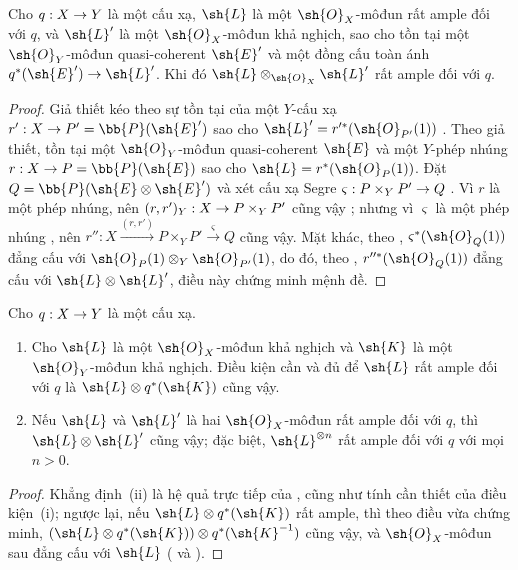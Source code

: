 \documentclass[oneside,10pt]{amsart}
\makeatletter
\newcommand{\ega@arrow}[2]{\mathchoice{#1}{#2}{#2}{#2}}
\renewcommand{\to}{\ega@arrow{\longrightarrow}{\rightarrow}}
\newcommand{\oldpage}[2][]{\marginnote{\normalfont\footnotesize\textbf{#1}~|~#2}\ignorespaces}
\let\EGAOriginalLabel\label
\renewcommand{\label}[1]{\phantomsection\EGAOriginalLabel{#1}}
\makeatother
\begin{document}
\begin{proposition}[4.4.8]
\label{II.4.4.8}
Cho $q:X\to Y$ là một cấu xạ, $\sh{L}$ là một $\sh{O}_X$-môđun rất ample đối với $q$, và $\sh{L}'$ là một $\sh{O}_X$-môđun khả nghịch, sao cho tồn tại một $\sh{O}_Y$-môđun quasi-coherent $\sh{E}'$ và một đồng cấu toàn ánh $q^*(\sh{E}')\to\sh{L}'$.
Khi đó $\sh{L}\otimes_{\sh{O}_X}\sh{L}'$ rất ample đối với $q$.
\end{proposition}

\begin{proof}
Giả thiết kéo theo sự tồn tại của một $Y$-cấu xạ $r':X\to P'=\bb{P}(\sh{E}')$ sao cho $\sh{L}'=r'^*(\sh{O}_{P'}(1))$ .
Theo giả thiết, tồn tại một $\sh{O}_Y$-môđun quasi-coherent $\sh{E}$ và một
\oldpage[II]{81}
$Y$-phép nhúng $r:X\to P=\bb{P}(\sh{E})$ sao cho $\sh{L}=r^*(\sh{O}_P(1))$.
Đặt $Q=\bb{P}(\sh{E}\otimes\sh{E}')$ và xét cấu xạ Segre $\varsigma:P\times_Y P'\to Q$ .
Vì $r$ là một phép nhúng, nên $(r,r')_Y:X\to P\times_Y P'$ cũng vậy ;
nhưng vì $\varsigma$ là một phép nhúng , nên $r'':X\xrightarrow{(r,r')}P\times_Y P'\xrightarrow{\varsigma}Q$ cũng vậy.
Mặt khác, theo , $\varsigma^*(\sh{O}_Q(1))$ đẳng cấu với $\sh{O}_P(1)\otimes_Y\sh{O}_{P'}(1)$, do đó, theo , $r''^*(\sh{O}_Q(1))$ đẳng cấu với $\sh{L}\otimes\sh{L}'$, điều này chứng minh mệnh đề.
\end{proof}

\begin{corollary}[4.4.9]
\label{II.4.4.9}
Cho $q:X\to Y$ là một cấu xạ.
\begin{enumerate}
  \item Cho $\sh{L}$ là một $\sh{O}_X$-môđun khả nghịch và $\sh{K}$ là một $\sh{O}_Y$-môđun khả nghịch.
  Điều kiện cần và đủ để $\sh{L}$ rất ample đối với $q$ là $\sh{L}\otimes q^*(\sh{K})$ cũng vậy.
  \item Nếu $\sh{L}$ và $\sh{L}'$ là hai $\sh{O}_X$-môđun rất ample đối với $q$, thì $\sh{L}\otimes\sh{L}'$ cũng vậy;
  đặc biệt, $\sh{L}^{\otimes n}$ rất ample đối với $q$ với mọi $n>0$.
\end{enumerate}
\end{corollary}

\begin{proof}
Khẳng định~(ii) là hệ quả trực tiếp của , cũng như tính cần thiết của điều kiện~(i);
ngược lại, nếu $\sh{L}\otimes q^*(\sh{K})$ rất ample, thì theo điều vừa chứng minh, $(\sh{L}\otimes q^*(\sh{K}))\otimes q^*(\sh{K}^{-1})$ cũng vậy, và $\sh{O}_X$-môđun sau đẳng cấu với $\sh{L}$ ( và ).
\end{proof}
\end{document}
